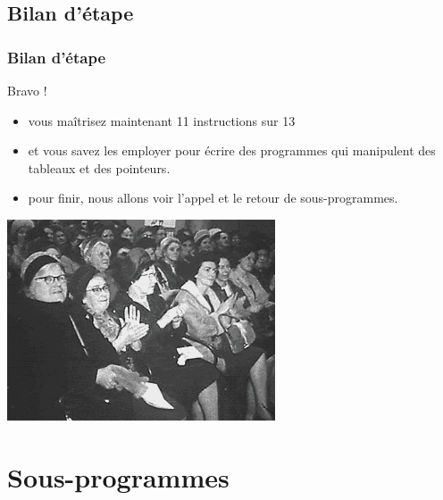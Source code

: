 \subsection{Bilan d'étape}
\begin{frame}
\frametitle{Bilan d'étape}
\begin{multicols}{2}
\alert{Bravo !}
\begin{itemize}
\item vous maîtrisez maintenant 11 instructions sur 13
\item et vous savez les employer pour écrire des programmes qui manipulent des tableaux
et des pointeurs.
\item pour finir, nous allons voir l'appel et le retour de sous-programmes.
\end{itemize}

\includegraphics[width=\linewidth]{images/anim/congrats-0}

\end{multicols}
\end{frame}

\section{Sous-programmes}


